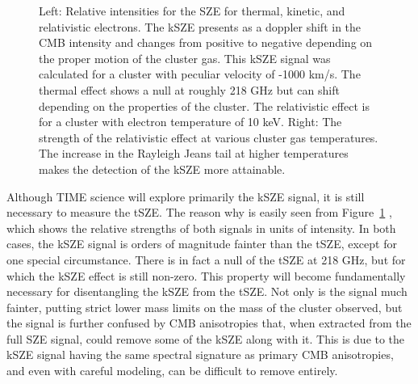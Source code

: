 \documentclass[manuscript]{aastex}
\begin{document}
\begin{figure}[!ht]%
    \centering
    \qquad
    \singlespace
    \caption[Intensities of the kSZE, tSZE, and rSZE for simulated galaxy cluster.]{Left: Relative intensities for the SZE for thermal, kinetic, and relativistic electrons. The kSZE presents as a doppler shift in the CMB intensity and changes from positive to negative depending on the proper motion of the cluster gas. This kSZE signal was calculated for a cluster with peculiar velocity of -1000 km/s. The thermal effect shows a null at roughly 218 GHz but can shift depending on the properties of the cluster. The relativistic effect is for a cluster with electron temperature of 10 keV. Right: The strength of the relativistic effect at various cluster gas temperatures. The increase in the Rayleigh Jeans tail at higher temperatures makes the detection of the kSZE more attainable.}%
    \label{fig:tksze}%
\end{figure}

Although TIME science will explore primarily the kSZE signal, it is still necessary to measure the tSZE. The reason why is easily seen from Figure~\ref{fig:tksze} , which shows the relative strengths of both signals in units of intensity. In both cases, the kSZE signal is orders of magnitude fainter than the tSZE, except for one special circumstance. There is in fact a null of the tSZE at 218 GHz, but for which the kSZE effect is still non-zero. This property will become fundamentally necessary for disentangling the kSZE from the tSZE. Not only is the signal much fainter, putting strict lower mass limits on the mass of the cluster observed, but the signal is further confused by CMB anisotropies that, when extracted from the full SZE signal, could remove some of the kSZE along with it. This is due to the kSZE signal having the same spectral signature as primary CMB anisotropies, and even with careful modeling, can be difficult to remove entirely. 
\end{document}
